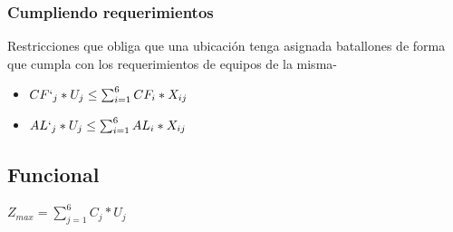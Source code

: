 \documentclass[12pt]{article}
\begin{document}
\subsubsection{Cumpliendo requerimientos}

Restricciones que obliga que una ubicación tenga asignada batallones de forma que cumpla con los requerimientos de equipos de la misma-

\begin{itemize}
    \item $ CF`_{j} * U_{j} \leq \sum_{i=1}^{6} CF_{i} * X_{ij}$
    \item $ AL`_{j} * U_{j} \leq \sum_{i=1}^{6} AL_{i} * X_{ij}$
\end{itemize}

\subsection{Funcional}

$Z_{max} = \sum_{j=1}^{6} C_{j} * U_{j}$
\end{document}
